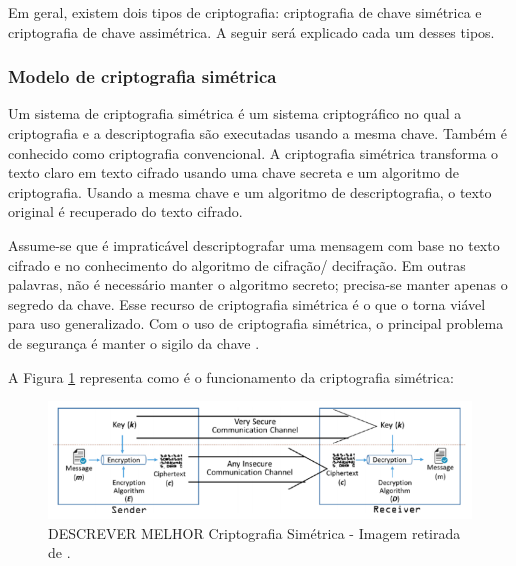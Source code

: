     Em geral, existem dois tipos de criptografia: criptografia de chave simétrica e criptografia de chave assimétrica. A seguir será explicado cada um desses tipos.

        \subsubsection{Modelo de criptografia simétrica}
        
            Um sistema de criptografia simétrica é um sistema criptográfico no qual a criptografia e a descriptografia são executadas usando a mesma chave. Também é conhecido como criptografia convencional. A criptografia simétrica transforma o texto claro em texto cifrado usando uma chave secreta e um algoritmo de criptografia. Usando a mesma chave e um algoritmo de descriptografia, o texto original é recuperado do texto cifrado.\cite{cryptograpy_and_network_stallings}
            
            Assume-se que é impraticável descriptografar uma mensagem com base no texto cifrado e no conhecimento do algoritmo de cifração/ decifração. Em outras palavras, não é necessário manter o algoritmo secreto; precisa-se manter apenas o segredo da chave. Esse recurso de criptografia simétrica é o que o torna viável para uso generalizado. Com o uso de criptografia simétrica, o principal problema de segurança é manter o sigilo da chave \cite{cryptograpy_and_network_stallings}.
            
            A Figura \ref{fig:imagem_criptografia_simetrica} representa como é o funcionamento da criptografia simétrica:
            
            \begin{figure}[H]
                 \centering
                 \includegraphics[scale=0.6]{figuras/capitulo_2/criptografia_simetrica.png}
                 \caption{DESCREVER MELHOR Criptografia Simétrica - Imagem retirada de \cite{beginnig_blockchain_bikramaditya}.}
                 \label{fig:imagem_criptografia_simetrica}
            \end{figure}
            

